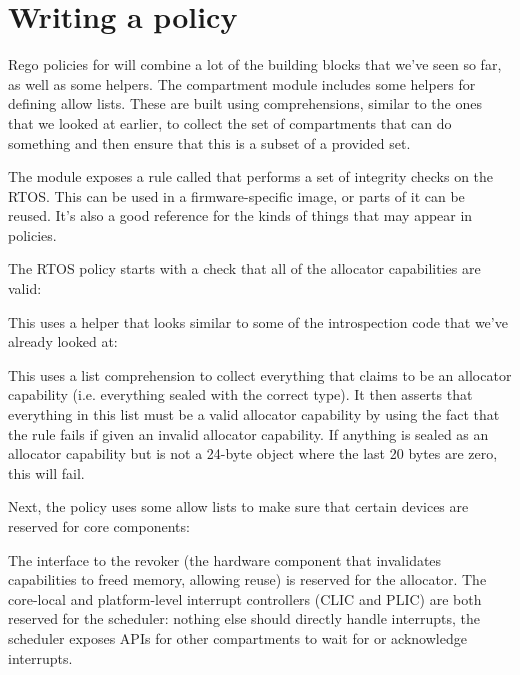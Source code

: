 {\section{Writing a policy}

Rego policies for  will combine a lot of the building blocks that we've seen so far, as well as some helpers.
The compartment module includes some helpers for defining allow lists.
These are built using comprehensions, similar to the ones that we looked at earlier, to collect the set of compartments that can do something and then ensure that this is a subset of a provided set.

The  module exposes a rule called  that performs a set of integrity checks on the RTOS.
This can be used in a firmware-specific image, or parts of it can be reused.
It's also a good reference for the kinds of things that may appear in policies.

The RTOS policy starts with a check that all of the allocator capabilities are valid:

\regolisting[filename=examples/auditing-rtos/rtos.rego,marker=allsealedvalid,label=lst:allsealedvalid,caption="The Rego expression checking that all sealed allocator capabilities are valid"]{}

This uses a helper that looks similar to some of the introspection code that we've already looked at:

\regolisting[filename=examples/auditing-rtos/rtos.rego,marker=allsealedvalidimpl,label=lst:allsealedvalidimpl,caption="The Rego rule implementing the check that all sealed allocator capabilities are valid"]{}

This uses a list comprehension to collect everything that claims to be an allocator capability (i.e. everything sealed with the correct type).
It then asserts that everything in this list must be a valid allocator capability by using the fact that the  rule fails if given an invalid allocator capability.
If anything is sealed as an allocator capability but is not a 24-byte object where the last 20 bytes are zero, this will fail.

Next, the policy uses some allow lists to make sure that certain devices are reserved for core components:

\regolisting[filename=examples/auditing-rtos/rtos.rego,marker=allowlists,label=lst:allowlists,caption="The compartment allow lists in the RTOS policy"]{}

The interface to the revoker (the hardware component that invalidates capabilities to freed memory, allowing reuse) is reserved for the allocator.
The core-local and platform-level interrupt controllers (CLIC and PLIC) are both reserved for the scheduler: nothing else should directly handle interrupts, the scheduler exposes APIs for other compartments to wait for or acknowledge interrupts.

}
